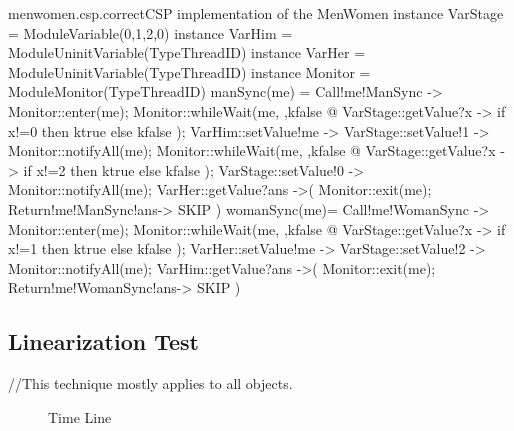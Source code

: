 \documentclass{article}
\begin{document}
\begin{cspfloat}{menwomen.csp.correct}{CSP implementation of the MenWomen}
instance VarStage = ModuleVariable({0,1,2},0) 
instance VarHim = ModuleUninitVariable(TypeThreadID)
instance VarHer = ModuleUninitVariable(TypeThreadID)
instance Monitor = ModuleMonitor(TypeThreadID)
manSync(me) = 
  Call!me!ManSync ->
  Monitor::enter(me);
    Monitor::whileWait(me, \ktrue,kfalse @
      VarStage::getValue?x ->
      if x!=0 then ktrue else kfalse
    );
    VarHim::setValue!me ->
    VarStage::setValue!1 ->
    Monitor::notifyAll(me);
    Monitor::whileWait(me, \ktrue,kfalse @
      VarStage::getValue?x ->
      if x!=2 then ktrue else kfalse
    );
    VarStage::setValue!0 ->
    Monitor::notifyAll(me);
    VarHer::getValue?ans ->(
  Monitor::exit(me);
  Return!me!ManSync!ans->
  SKIP
  )
womanSync(me)=
  Call!me!WomanSync ->
  Monitor::enter(me);
    Monitor::whileWait(me, \ktrue,kfalse @
      VarStage::getValue?x ->
      if x!=1 then ktrue else kfalse
    );
    VarHer::setValue!me ->
    VarStage::setValue!2 ->
    Monitor::notifyAll(me);
    VarHim::getValue?ans ->(
  Monitor::exit(me);
  Return!me!WomanSync!ans->
  SKIP
  )
\end{cspfloat}


\subsection{Linearization Test}
//This technique mostly applies to all objects.

\begin{figure}
  \centering
  \label{menwomen.timeline}
  \caption{Time Line}
\end{figure}
\end{document}
